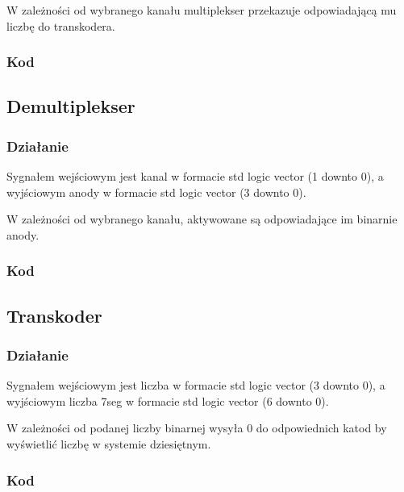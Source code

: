 \vspace*{0.5cm}

\hspace*{0.5cm}W zależności od wybranego kanału multiplekser przekazuje odpowiadającą mu liczbę do transkodera.
\subsubsection{Kod}


\subsection{Demultiplekser}
\subsubsection{Działanie}
\hspace*{0.5cm}Sygnałem wejściowym jest kanal w formacie std logic vector (1 downto 0), a wyjściowym anody w formacie std logic vector (3 downto 0).

\vspace*{0.5cm}

\hspace*{0.5cm}W zależności od wybranego kanału, aktywowane są odpowiadające im binarnie anody.
\subsubsection{Kod}


\subsection{Transkoder}
\subsubsection{Działanie}
\hspace*{0.5cm}Sygnałem wejściowym jest liczba w formacie std logic vector (3 downto 0), a wyjściowym liczba 7seg w formacie std logic vector (6 downto 0).

\vspace*{0.5cm}

\hspace*{0.5cm}W zależności od podanej liczby binarnej wysyła $0$ do odpowiednich katod by wyświetlić liczbę w systemie dziesiętnym.
\subsubsection{Kod}
